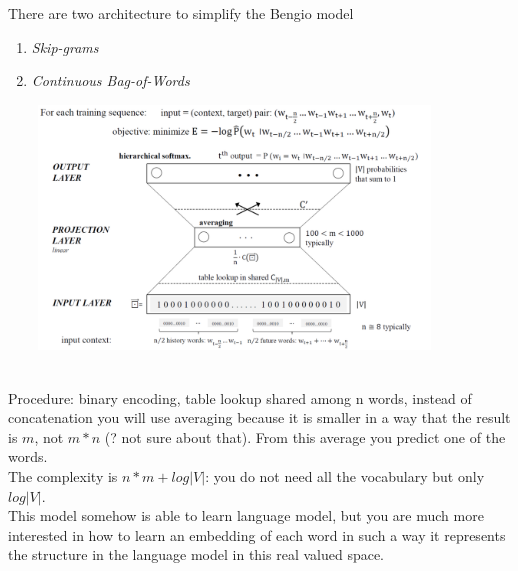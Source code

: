 There are two architecture to simplify the Bengio model
\begin{enumerate}
    \item \textit{Skip-grams}
    \item \textit{Continuous Bag-of-Words}
\end{enumerate}{}



\begin{minipage}{\linewidth}
        \centering
        \includegraphics[width=12cm, height=6.5cm]{images/w2v.png}
\end{minipage} \\

Procedure: binary encoding, table lookup shared among n words, instead of concatenation you will use averaging because it is smaller in a way that the result is $m$, not $m * n$ (? not sure about that). From this average you predict one of the words. \\
The complexity is $n * m +log |V|$: you do not need all the vocabulary but only $log |V|$.\\
This model somehow is able to learn language model, but you are much more interested in how to learn an embedding of each word in such a way it represents the structure in the language model in this real valued space. \\

